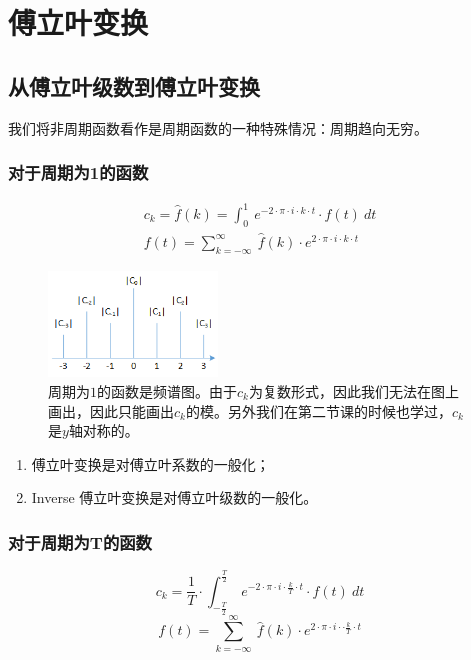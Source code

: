 \chapter{傅立叶变换}
\section{从傅立叶级数到傅立叶变换}
我们将非周期函数看作是周期函数的一种特殊情况：周期趋向无穷。
\subsection{对于周期为1的函数}
\begin{align*}
	c_k=\hat{f}(k)=\int_0^1\ e^{-2\cdot \pi\cdot i\cdot k\cdot t}\cdot f(t)\ dt \\
	f(t)=\sum\limits_{k=-\infty}^{\infty}\ \hat{f}(k)\cdot e^{2\cdot \pi\cdot i\cdot k\cdot t}
\end{align*}
\begin{figure}[H]
	\centering
	\includegraphics[width=0.4\textwidth]{assets/ft1.png}
	\caption{周期为$1$的函数是频谱图。由于$c_k$为复数形式，因此我们无法在图上画出，因此只能画出$c_k$的模。另外我们在第二节课的时候也学过，$c_k$是$y$轴对称的。}
\end{figure}
\begin{enumerate}
	\item 傅立叶变换是对傅立叶系数的一般化；
	\item Inverse 傅立叶变换是对傅立叶级数的一般化。
\end{enumerate}
\subsection{对于周期为T的函数}
$$
	c_k=\frac{1}{T}\cdot \int_{-\frac{T}{2}}^{\frac{T}{2}}\ e^{-2\cdot \pi\cdot i\cdot \frac{k}{T}\cdot t}\cdot f(t)\ dt
$$
$$
	f(t)=\sum\limits_{k=-\infty}^{\infty}\ \hat{f}(k)\cdot e^{2\cdot \pi\cdot i\cdot\cdot  \frac{k}{T}\cdot t}
$$

